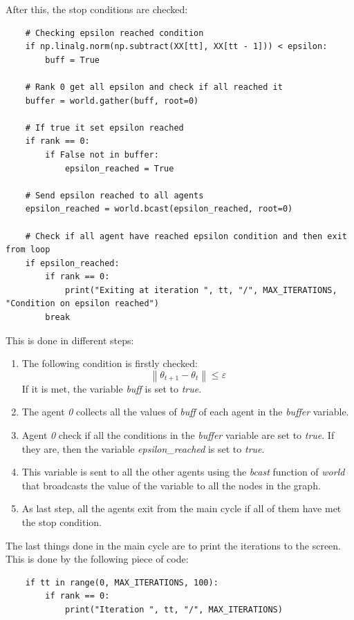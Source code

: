\documentclass[a4paper,11pt,oneside]{book}
\begin{document}
After this, the stop conditions are checked: \\
\begin{lstlisting}
    # Checking epsilon reached condition
    if np.linalg.norm(np.subtract(XX[tt], XX[tt - 1])) < epsilon:
        buff = True

    # Rank 0 get all epsilon and check if all reached it
    buffer = world.gather(buff, root=0)

    # If true it set epsilon reached
    if rank == 0:
        if False not in buffer:
            epsilon_reached = True

    # Send epsilon reached to all agents
    epsilon_reached = world.bcast(epsilon_reached, root=0)

    # Check if all agent have reached epsilon condition and then exit from loop
    if epsilon_reached:
        if rank == 0:
            print("Exiting at iteration ", tt, "/", MAX_ITERATIONS, "Condition on epsilon reached")
        break
\end{lstlisting}

This is done in different steps:
\begin{enumerate}
	\item The following condition is firstly checked:
	\begin{equation}
		\left\lVert \theta_{t+1} - \theta_{t} \right\rVert
		\leq \varepsilon
	\end{equation}
	If it is met, the variable \textit{buff} is set to \textit{true}. 
	\item The agent \textit{0} collects all the values of \textit{buff} of each agent in the \textit{buffer} variable.
	\item Agent \textit{0} check if all the conditions in the \textit{buffer} variable are set to \textit{true}. If they are, then the variable \textit{epsilon\_reached} is set to \textit{true}.
	\item This variable is sent to all the other agents using the \textit{bcast} function of \textit{world} that broadcasts the value of the variable to all the nodes in the graph.
	\item As last step, all the agents exit from the main cycle if all of them have met the stop condition. 
\end{enumerate}

The last things done in the main cycle are to print the iterations to the screen. This is done by the following piece of code:
\begin{lstlisting}
    if tt in range(0, MAX_ITERATIONS, 100):
        if rank == 0:
            print("Iteration ", tt, "/", MAX_ITERATIONS)
\end{lstlisting}
\end{document}
